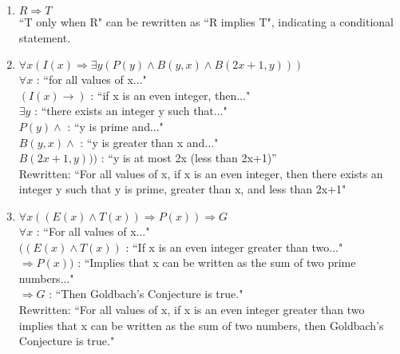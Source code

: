 \documentclass{article}
\theoremstyle{definition}
\begin{document}
\begin{enumerate}[label = \alph*)]
    \item 
    $R \Rightarrow T$ \\
    ``T only when R" can be rewritten as ``R implies T", indicating a conditional statement.
    
    \item
    $\forall x (I(x) \Rightarrow \exists y ( P(y) \wedge B(y, x) \wedge B(2x+1, y)))$\\
    $\forall x$ : ``for all values of x..."\\
    $(I(x)\rightarrow )$ : ``if x is an even integer, then..."\\
    $\exists y$ : ``there exists an integer y such that..."\\
    $P(y) \wedge$ : ``y is prime and..."\\
    $B(y,x) \wedge$ : ``y is greater than x and..."\\
    $B(2x+1, y)))$ : ``y is at most 2x (less than 2x+1)'' \\
    Rewritten: ``For all values of x, if x is an even integer, then there exists an integer y such that y is prime, greater than x, and less than 2x+1"
    
    \item
    $\forall x ((E(x) \wedge T(x)) \Rightarrow P(x)) \Rightarrow G$\\
    $\forall x$ : ``For all values of x..."\\
    $((E(x) \wedge T(x))$ : ``If x is an even integer greater than two..."\\
    $\Rightarrow P(x))$ : ``Implies that x can be written as the sum of two prime numbers..." \\
    $\Rightarrow G$ : ``Then Goldbach's Conjecture is true."\\
    Rewritten: ``For all values of x, if x is an even integer greater than two implies that x can be written as the sum of two numbers, then Goldbach's Conjecture is true."
\end{enumerate}
\end{document}
